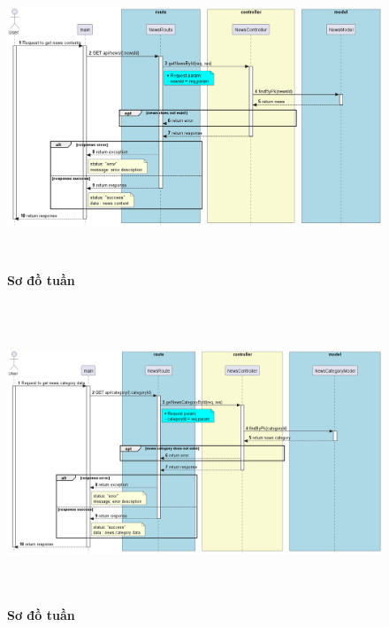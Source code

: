 \documentclass{article}%
\begin{document}
\begin{figure}[H]
  \centering
  \includegraphics[width=16cm,height=9cm]{Images/server/sequence/server/getNewsById.png}
  \caption[Sơ đồ tuần tự ]{\bfseries \fontsize{12pt}{0pt}
  \selectfont Sơ đồ tuần }
  \label{hinh21} %
\end{figure}


\begin{figure}[H]
  \centering
  \includegraphics[width=16cm,height=9cm]{Images/server/sequence/server/getNewsCategoryById.png}
  \caption[Sơ đồ tuần tự ]{\bfseries \fontsize{12pt}{0pt}
  \selectfont Sơ đồ tuần }
  \label{hinh21} %
\end{figure}
\end{document}
